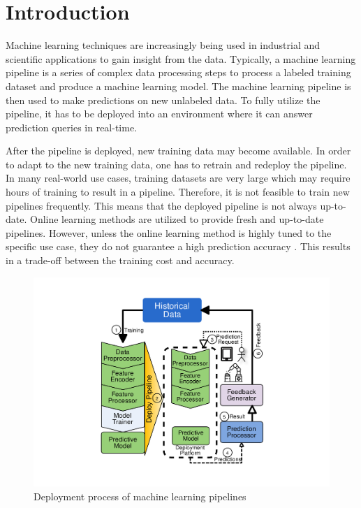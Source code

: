 \section{Introduction} \label{introduction}
Machine learning techniques are increasingly being used in industrial and scientific applications to gain insight from the data.
Typically, a machine learning pipeline is a series of complex data processing steps to process a labeled training dataset and produce a machine learning model.
The machine learning pipeline is then used to make predictions on new unlabeled data.
To fully utilize the pipeline, it has to be deployed into an environment where it can answer prediction queries in real-time.

After the pipeline is deployed, new training data may become available.
In order to adapt to the new training data, one has to retrain and redeploy the pipeline.
In many real-world use cases, training datasets are very large which may require hours of training to result in a pipeline.
Therefore, it is not feasible to train new pipelines frequently.
This means that the deployed pipeline is not always up-to-date.
Online learning methods are utilized to provide fresh and up-to-date pipelines.
However, unless the online learning method is highly tuned to the specific use case, they do not guarantee a high prediction accuracy \cite{ma2009identifying, macmahan2013}. 
This results in a trade-off between the training cost and accuracy.

\begin{figure}[h!]
\centering
\includegraphics[width=\columnwidth]{../images/generic-motivational-example.pdf}
\caption{Deployment process of machine learning pipelines}
\label{fig:motivational-example}
\end{figure}

